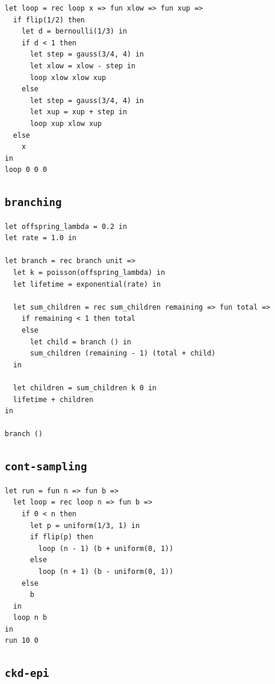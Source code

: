 \begin{lstlisting}[breaklines=true]
let loop = rec loop x => fun xlow => fun xup =>
  if flip(1/2) then
    let d = bernoulli(1/3) in
    if d < 1 then
      let step = gauss(3/4, 4) in
      let xlow = xlow - step in
      loop xlow xlow xup
    else
      let step = gauss(3/4, 4) in
      let xup = xup + step in
      loop xup xlow xup
  else
    x
in
loop 0 0 0
\end{lstlisting}

\subsection{\texttt{branching}}

\begin{lstlisting}[breaklines=true]
let offspring_lambda = 0.2 in
let rate = 1.0 in

let branch = rec branch unit =>
  let k = poisson(offspring_lambda) in
  let lifetime = exponential(rate) in

  let sum_children = rec sum_children remaining => fun total =>
    if remaining < 1 then total
    else
      let child = branch () in
      sum_children (remaining - 1) (total + child)
  in

  let children = sum_children k 0 in
  lifetime + children
in

branch ()
\end{lstlisting}

\subsection{\texttt{cont-sampling}}

\begin{lstlisting}[breaklines=true]
let run = fun n => fun b =>
  let loop = rec loop n => fun b =>
    if 0 < n then
      let p = uniform(1/3, 1) in
      if flip(p) then
        loop (n - 1) (b + uniform(0, 1))
      else
        loop (n + 1) (b - uniform(0, 1))
    else
      b
  in
  loop n b
in
run 10 0
\end{lstlisting}

\subsection{\texttt{ckd-epi}}

